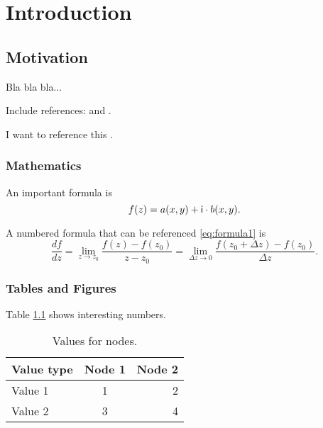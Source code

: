 \chapter{Introduction}
\label{chap:introduction}

\section{Motivation}
Bla bla bla...

Include references: \cite{cover} and \cite{telatar,tse,costa}.

I want to reference this \cite{RaphaelPaper}. 


\subsection{Mathematics}
An important formula is
\[ f(z) = a(x,y) + \mathsf{i} \cdot b(x,y).
\]

A numbered formula that can be referenced \eqref{eq:formula1} is 
\begin{equation}
\label{eq:formula1}
\frac{d f}{d z} = \lim_{z \to z_0}\frac{f(z)-f(z_0)}{z - z_0} = \lim_{\Delta z \to 0}\frac{f(z_0 + \Delta z)- f(z_0)}{\Delta z}.
\end{equation}



\subsection{Tables and Figures}

Table \ref{tbl:Values1} shows interesting numbers.

\begin{table}[h]
\begin{center}
\label{blaq1}
  \begin{tabular}{| l || c | r |} \hline
  Value type & Node 1 & Node 2 \\ \hline \hline
  Value 1 & 1 & 2 				\\ \hline
  Value 2 & 3 & 4 				\\ \hline
\end{tabular}
\caption{Values for nodes.}
\label{tbl:Values1}
\end{center}
\end{table}

